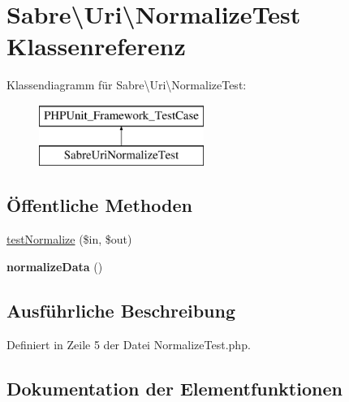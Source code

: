 \hypertarget{class_sabre_1_1_uri_1_1_normalize_test}{}\section{Sabre\textbackslash{}Uri\textbackslash{}Normalize\+Test Klassenreferenz}
\label{class_sabre_1_1_uri_1_1_normalize_test}
Klassendiagramm für Sabre\textbackslash{}Uri\textbackslash{}Normalize\+Test\+:\begin{figure}[H]
\begin{center}
\leavevmode
\includegraphics[height=2.000000cm]{class_sabre_1_1_uri_1_1_normalize_test}
\end{center}
\end{figure}
\subsection*{Öffentliche Methoden}
\begin{DoxyCompactItemize}
\item 
\mbox{\hyperlink{class_sabre_1_1_uri_1_1_normalize_test_a9cbfc53177ecb4e435a159b1b4e6f29a}{test\+Normalize}} (\$in, \$out)
\item 
\mbox{\label{class_sabre_1_1_uri_1_1_normalize_test_aba73f9de166405862d2ed1018b378e88}} 
{\bfseries normalize\+Data} ()
\end{DoxyCompactItemize}


\subsection{Ausführliche Beschreibung}


Definiert in Zeile 5 der Datei Normalize\+Test.\+php.



\subsection{Dokumentation der Elementfunktionen}
\mbox{\label{class_sabre_1_1_uri_1_1_normalize_test_a9cbfc53177ecb4e435a159b1b4e6f29a}} 
